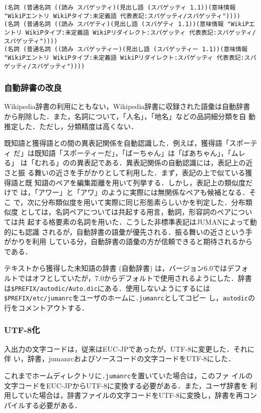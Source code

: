 \documentclass[a4j,titlepage]{jarticle}
\begin{document}
\begin{verbatim}
(名詞 (普通名詞 ((読み スパゲッティ)(見出し語 (スパゲッティ 1.1))(意味情報 "WikiPエントリ WikiPタイプ:未定義語 代表表記:スパゲッティ/スパゲッティ"))))
(名詞 (普通名詞 ((読み スパゲティ)(見出し語 (スパゲティ 1.1))(意味情報 "WikiPエントリ WikiPタイプ:未定義語 WikiPリダイレクト:スパゲッティ 代表表記:スパゲッティ/スパゲッティ"))))
(名詞 (普通名詞 ((読み スパゲッティー)(見出し語 (スパゲッティー 1.1))(意味情報 "WikiPエントリ WikiPタイプ:未定義語 WikiPリダイレクト:スパゲッティ 代表表記:スパゲッティ/スパゲッティ"))))
\end{verbatim}


\subsubsection{自動辞書の改良}

Wikipedia辞書の利用にともない，Wikipedia辞書に収録された語彙は自動辞書
から削除した．また，名詞について，「人名」，「地名」などの品詞細分類を自
動推定した．ただし，分類精度は高くない．

既知語と獲得語との間の異表記関係を自動認識した．例えば，獲得語「スポーティ
だ」は既知語「スポーティーだ」，「ばーちゃん」は「ばあちゃん」，「ムレる」
は「むれる」のの異表記である．異表記関係の自動認識には，表記上の近さと振
る舞いの近さを手がかりとして利用した．まず，表記の上で似ている獲得語と既
知語のペアを編集距離を用いて列挙する．しかし，表記上の類似度だけで
は，「アワー」と「アワ」のように実際には無関係なペアも候補となる．そこ
で，次に分布類似度を用いて実際に同じ形態素らしいかを判定した．分布類似度
としては，名詞ペアについては共起する用言，動詞，形容詞のペアについては共
起する格要素の名詞を用いた．こうした非標準表記はJUMANによって動的にも認識
されるが，自動辞書の語彙が優先される．振る舞いの近さという手がかりを利用
している分，自動辞書の語彙の方が信頼できると期待されるからである．

テキストから獲得した未知語の辞書 (自動辞書) は，バージョン6.0ではデフォ
ルトではオフとしていたが，7.0からデフォルトで使用されるようにした．辞書
は\texttt{\$PREFIX/autodic/Auto.dic}にある．使用しないようにするには
\texttt{\$PREFIX/etc/jumanrc}をユーザのホームに{\tt .jumanrc}としてコピー
し，\texttt{autodic}の行をコメントアウトする．


\subsubsection{UTF-8化}

入出力の文字コードは，従来はEUC-JPであったが，UTF-8に変更した．それに伴
い，辞書，jumanrcおよびソースコードの文字コードをUTF-8にした．

これまでホームディレクトリに\texttt{.jumanrc}を置いていた場合は，このファ
イルの文字コードをEUC-JPからUTF-8に変換する必要がある．また，ユーザ辞書を
利用していた場合は，辞書ファイルの文字コードをUTF-8に変換し，辞書を再コン
パイルする必要がある．


\end{document}
